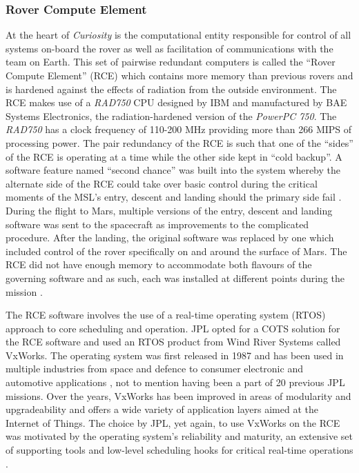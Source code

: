       \subsubsection{Rover Compute Element}
        At the heart of \textit{Curiosity} is the computational entity responsible for control of all systems on-board the rover as well as facilitation of communications with the team on Earth. This set of pairwise redundant computers is called the ``Rover Compute Element'' (RCE) which contains more memory than previous rovers and is hardened against the effects of radiation from the outside environment. The RCE makes use of a \textit{RAD750} CPU designed by IBM and manufactured by BAE Systems Electronics, the radiation-hardened version of the \textit{PowerPC 750}. The \textit{RAD750} has a clock frequency of 110-200 MHz providing more than 266 MIPS of processing power. The pair redundancy of the RCE is such that one of the ``sides'' of the RCE is operating at a time while the other side kept in ``cold backup''. A software feature named ``second chance'' was built into the system whereby the alternate side of the RCE could take over basic control during the critical moments of the MSL's entry, descent and landing should the primary side fail \cite{nasajulypresskit}. During the flight to Mars, multiple versions of the entry, descent and landing software was sent to the spacecraft as improvements to the complicated procedure. After the landing, the original software was replaced by one which included control of the rover specifically on and around the surface of Mars. The RCE did not have enough memory to accommodate both flavours of the governing software and as such, each was installed at different points during the mission \cite{cnn2012milesoff}.
        
        The RCE software involves the use of a real-time operating system (RTOS) approach to core scheduling and operation. JPL opted for a COTS solution for the RCE software and used an RTOS product from Wind River Systems called VxWorks. The operating system was first released in 1987 and has been used in multiple industries from space and defence to consumer electronic and automotive applications \cite{electronicsdesign2011vxworks}, not to mention having been a part of 20 previous JPL missions. Over the years, VxWorks has been improved in areas of modularity and upgradeability and offers a wide variety of application layers aimed at the Internet of Things. The choice by JPL, yet again, to use VxWorks on the RCE was motivated by the operating system's reliability and maturity, an extensive set of supporting tools and low-level scheduling hooks for critical real-time operations \cite{extremetech2012insidecuriosity}.
        
